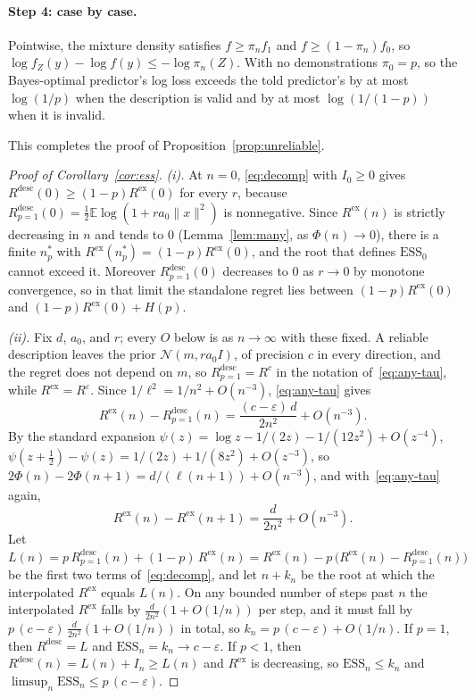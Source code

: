 \documentclass[10pt]{article}
\newcommand{\ess}{\mathrm{ESS}}
\newcommand{\E}{\mathbb{E}}
\begin{document}
\paragraph{Step 4: case by case.}
Pointwise, the mixture density satisfies $f \ge \pi_n f_1$ and $f \ge (1-\pi_n) f_0$, so $\log f_Z(y) - \log f(y) \le -\log \pi_n(Z)$. With no demonstrations $\pi_0 = p$, so the Bayes-optimal predictor's log loss exceeds the told predictor's by at most $\log(1/p)$ when the description is valid and by at most $\log(1/(1-p))$ when it is invalid.

This completes the proof of Proposition~\ref{prop:unreliable}.

\begin{proof}[Proof of Corollary~\ref{cor:ess}]
\emph{(i).} At $n = 0$, \eqref{eq:decomp} with $I_0 \ge 0$ gives $R^{\mathrm{desc}}(0) \ge (1-p)R^{\mathrm{ex}}(0)$ for every $r$, because $R^{\mathrm{desc}}_{p=1}(0) = \tfrac12 \E \log(1 + r a_0 \|x\|^2)$ is nonnegative. Since $R^{\mathrm{ex}}(n)$ is strictly decreasing in $n$ and tends to $0$ (Lemma~\ref{lem:many}, as $\Phi(n) \to 0$), there is a finite $n^*_p$ with $R^{\mathrm{ex}}(n^*_p) = (1-p)R^{\mathrm{ex}}(0)$, and the root that defines $\ess_0$ cannot exceed it. Moreover $R^{\mathrm{desc}}_{p=1}(0)$ decreases to $0$ as $r \to 0$ by monotone convergence, so in that limit the standalone regret lies between $(1-p)R^{\mathrm{ex}}(0)$ and $(1-p)R^{\mathrm{ex}}(0) + H(p)$.

\emph{(ii).} Fix $d$, $a_0$, and $r$; every $O$ below is as $n \to \infty$ with these fixed. A reliable description leaves the prior $\mathcal{N}(m, r a_0 I)$, of precision $c$ in every direction, and the regret does not depend on $m$, so $R^{\mathrm{desc}}_{p=1} = R^{c}$ in the notation of~\eqref{eq:any-tau}, while $R^{\mathrm{ex}} = R^{\varepsilon}$. Since $1/\ell^2 = 1/n^2 + O(n^{-3})$, \eqref{eq:any-tau} gives
\[
R^{\mathrm{ex}}(n) - R^{\mathrm{desc}}_{p=1}(n) = \frac{(c - \varepsilon)\,d}{2n^2} + O(n^{-3}).
\]
By the standard expansion $\psi(z) = \log z - 1/(2z) - 1/(12z^2) + O(z^{-4})$, $\psi(z + \tfrac12) - \psi(z) = 1/(2z) + 1/(8z^2) + O(z^{-3})$, so $2\Phi(n) - 2\Phi(n+1) = d/(\ell(n+1)) + O(n^{-3})$, and with~\eqref{eq:any-tau} again,
\[
R^{\mathrm{ex}}(n) - R^{\mathrm{ex}}(n+1) = \frac{d}{2n^2} + O(n^{-3}).
\]
Let $L(n) = p\,R^{\mathrm{desc}}_{p=1}(n) + (1-p)\,R^{\mathrm{ex}}(n) = R^{\mathrm{ex}}(n) - p\,\big(R^{\mathrm{ex}}(n) - R^{\mathrm{desc}}_{p=1}(n)\big)$ be the first two terms of~\eqref{eq:decomp}, and let $n + k_n$ be the root at which the interpolated $R^{\mathrm{ex}}$ equals $L(n)$. On any bounded number of steps past $n$ the interpolated $R^{\mathrm{ex}}$ falls by $\tfrac{d}{2n^2}(1 + O(1/n))$ per step, and it must fall by $p\,(c - \varepsilon)\,\tfrac{d}{2n^2}(1 + O(1/n))$ in total, so $k_n = p\,(c - \varepsilon) + O(1/n)$. If $p = 1$, then $R^{\mathrm{desc}} = L$ and $\ess_n = k_n \to c - \varepsilon$. If $p < 1$, then $R^{\mathrm{desc}}(n) = L(n) + I_n \ge L(n)$ and $R^{\mathrm{ex}}$ is decreasing, so $\ess_n \le k_n$ and $\limsup_n \ess_n \le p\,(c - \varepsilon)$.
\end{proof}
\end{document}
